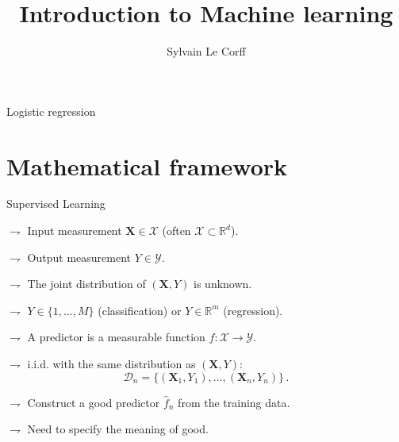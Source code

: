 \documentclass[xcolor={usenames,dvipsnames},handout]{beamer}
\begin{document}
\title[]{Introduction to Machine learning}
\author[S.~Le Corff]{Sylvain Le Corff}
\date{}

\begin{frame}[plain]
\titlepage
\end{frame}


\begin{frame}{Logistic regression}
\tableofcontents
\end{frame}



\section{Mathematical framework}


\begin{frame}{Supervised  Learning}

$\rightharpoondown$ \alert{Input} measurement $\textbf{X}  \in \mathcal{X}$ (often $\mathcal{X} \subset \mathbb{R}^d$).

$\rightharpoondown$  \alert{Output} measurement $Y \in \mathcal{Y}$.

$\rightharpoondown$  The joint distribution of $(\textbf{X},Y)$ is  \alert{unknown}.

$\rightharpoondown$  $Y \in \{1,\ldots,M\}$ (classification) or $Y \in \mathbb{R}^m$ (regression).


$\rightharpoondown$ A \alert{predictor} is a measurable function $f:\mathcal{X} \to \mathcal{Y}$.

\vspace{.5cm}


$\rightharpoondown$ i.i.d. with the same distribution as $(\textbf{X},Y)$:
$$\mathcal{D}_n=\{(\textbf{X}_1, Y_1),\ldots,(\textbf{X}_n, Y_n)\}\,.$$ 




\vspace{.5cm}


$\rightharpoondown$  Construct a \alert{good} predictor $\widehat{f}_n$ from the training data.

$\rightharpoondown$  Need to specify the meaning of good.

\end{frame}
\end{document}
